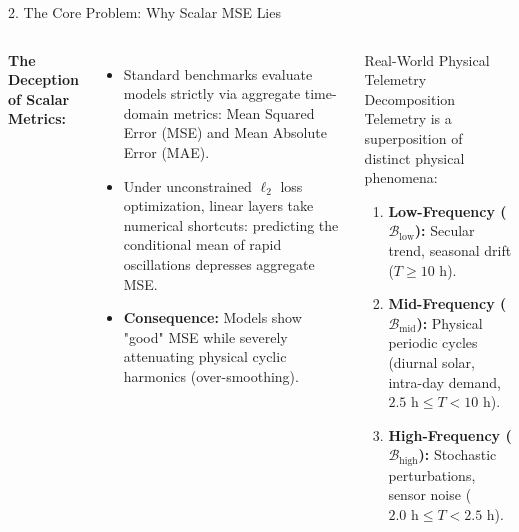 \documentclass[aspectratio=169, 10pt]{beamer}
\begin{document}
\begin{frame}{2. The Core Problem: Why Scalar MSE Lies}
\begin{columns}[T]
\textbf{The Deception of Scalar Metrics:}
\begin{itemize}
    \item Standard benchmarks evaluate models strictly via aggregate time-domain metrics: Mean Squared Error (MSE) and Mean Absolute Error (MAE).
    \item Under unconstrained $\ell_2$ loss optimization, linear layers take numerical shortcuts: predicting the conditional mean of rapid oscillations depresses aggregate MSE.
    \item \textbf{Consequence:} Models show "good" MSE while severely attenuating physical cyclic harmonics (over-smoothing).
\end{itemize}

\begin{block}{Real-World Physical Telemetry Decomposition}
Telemetry is a superposition of distinct physical phenomena:
\begin{enumerate}
    \item \textbf{Low-Frequency ($\mathcal{B}_{\text{low}}$):} Secular trend, seasonal drift ($T \ge 10\text{ h}$).
    \item \textbf{Mid-Frequency ($\mathcal{B}_{\text{mid}}$):} Physical periodic cycles (diurnal solar, intra-day demand, $2.5\text{ h} \le T < 10\text{ h}$).
    \item \textbf{High-Frequency ($\mathcal{B}_{\text{high}}$):} Stochastic perturbations, sensor noise ($2.0\text{ h} \le T < 2.5\text{ h}$).
\end{enumerate}
\end{block}
\end{columns}
\end{frame}
\end{document}
